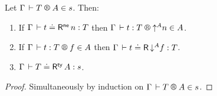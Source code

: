 \documentclass[acmlarge,review,anonymous]{acmart}\settopmatter{printfolios=true}
\newcommand{\SHORTVERSION}[1]{#1}
\begin{document}
\begin{theorem}
\label{thm:into}
\bla
Let $\LRTS{\Gamma} T A s$. Then:
\begin{enumerate}

\item \label{it:into}
   If\/ $\Gamma \,\vdash t \doteq \mathsf{R}^{\mathsf{ne}}\,n : T$ then
   $\LR \Gamma t T {\up A n} A$.

\item \label{it:out}
  If\/ $\LR \Gamma t T f A$ then
  $\Gamma \,\vdash t \doteq \mathsf{R}\,\mathord{\downarrow^{A}} f : T$.

\item \label{it:outty}
   $\Gamma \,\vdash T \doteq \mathsf{R}^{\mathsf{ty}}\,A : s$.




\end{enumerate}
\end{theorem}
\SHORTVERSION{
\begin{proof}
Simultaneously by induction on $\LRTS \Gamma T A s$.
\end{proof}
} %
\end{document}

